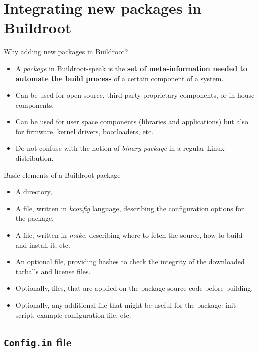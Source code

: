 
\section{Integrating new packages in Buildroot}

\begin{frame}{Why adding new packages in Buildroot?}
  \begin{itemize}
  \item A {\em package} in Buildroot-speak is the {\bf set of
      meta-information needed to automate the build process} of a
    certain component of a system.
  \item Can be used for open-source, third party proprietary
    components, or in-house components.
  \item Can be used for user space components (libraries and
    applications) but also for firmware, kernel drivers, bootloaders,
    etc.
  \item Do not confuse with the notion of {\em binary package} in a
    regular Linux distribution.
  \end{itemize}
\end{frame}

\begin{frame}{Basic elements of a Buildroot package}
  \begin{itemize}
  \item A directory, 
  \item A  file, written in {\em kconfig} language,
    describing the configuration options for the package.
  \item A  file, written in {\em make}, describing where to
    fetch the source, how to build and install it, etc.
  \item An optional  file, providing hashes to check
    the integrity of the downloaded tarballs and license files.
  \item Optionally,  files, that are applied on the
    package source code before building.
  \item Optionally, any additional file that might be useful for the
    package: init script, example configuration file, etc.
  \end{itemize}
\end{frame}

\subsection{{\tt Config.in} file}

